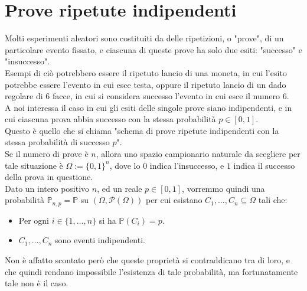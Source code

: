 \documentclass[11pt]{book}
\theoremstyle{Definizione}
\theoremstyle{TeoremaProposizioneLemmaCorollario}
\theoremstyle{OsservazioneNota}
\newcommand{\parti}[1]{\mathcal{P}\left({#1}\right)}
\renewcommand{\P}{\mathbb{P}}
\begin{document}
\section{Prove ripetute indipendenti}
Molti esperimenti aleatori sono costituiti da delle ripetizioni, o "prove", di un particolare evento fissato, e ciascuna di queste prove ha solo due esiti: "successo" e "insuccesso".\\
Esempi di ciò potrebbero essere il ripetuto lancio di una moneta, in cui l'esito potrebbe essere l'evento in cui esce testa, oppure il ripetuto lancio di un dado regolare di $6$ facce, in cui si considera successo l'evento in cui esce il numero $6$.\\
A noi interessa il caso in cui gli esiti delle singole prove siano indipendenti, e in cui ciascuna prova abbia successo con la stessa probabilità $p\in [0,1]$.\\
Questo è quello che si chiama "schema di prove ripetute indipendenti con la stessa probabilità di successo $p$".\\
Se il numero di prove è $n$, allora uno spazio campionario naturale da scegliere per tale situazione è $\Omega:=\{0,1\}^n$, dove lo $0$ indica l'insuccesso, e $1$ indica il successo della prova in questione.\\
Dato un intero positivo $n$, ed un reale $p\in [0,1]$, vorremmo quindi una probabilità $\P_{n,p}= \P$ su $(\Omega,\parti{\Omega})$ per cui esistano $C_1,\dots,C_n\subseteq \Omega$ tali che:
\begin{itemize}
\item Per ogni $i\in \{1,\dots,n\}$ si ha $\P(C_i) = p$.
\item $C_1,\dots,C_n$ sono eventi indipendenti.
\end{itemize}
Non è affatto scontato però che queste proprietà si contraddicano tra di loro, e che quindi rendano impossibile l'esistenza di tale probabilità, ma fortunatamente tale non è il caso.
\end{document}
